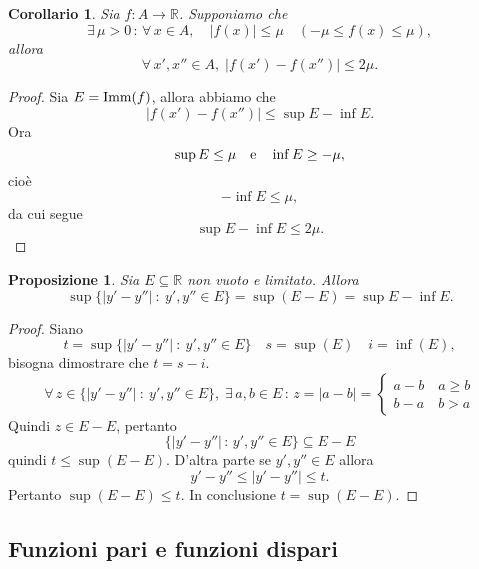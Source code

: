\documentclass{article}
\theoremstyle{plain}
\newtheorem{prop}[thm]{Proposizione}
\newtheorem{cor}{Corollario}
\theoremstyle{definition}
\theoremstyle{remark}
\begin{document}
\vspace{10pt}

\begin{bxthm}
\begin{cor}
    Sia $f:A\to\mathbb{R}$. Supponiamo che 
    \[\exists\,\mu>0\,:\,\forall\, x\in A,\quad |f(x)|\leq\mu\quad (-\mu\leq f(x)\leq \mu),\]
    allora \[\forall\, x',x''\in A,\; |f(x')-f(x'')|\leq 2\mu.\]
\end{cor}
\end{bxthm}
\begin{proof}
    Sia $E=\textup{Imm}(f)$, allora abbiamo che \[|f(x')-f(x'')|\leq\sup E-\inf E.\]
    Ora \[\sup E\leq\mu\quad\textup{e}\quad\inf E\geq -\mu,\] cioè \[-\inf E\leq \mu,\] da cui segue 
    \[\sup E-\inf E\leq 2\mu.\]
\end{proof}

\vspace{10pt}

\begin{bxthm}
\begin{prop}
    Sia $E\subseteq\mathbb{R}$ non vuoto e limitato.
    Allora \[\sup\{|y'-y''| \ : \ y',y''\in E\}=\sup(E-E)=\sup E-\inf E.\]
\end{prop}
\end{bxthm}
\begin{proof}
    Siano 
    \[t=\sup\{|y'-y''| \  : \ y',y''\in E\}\quad s=\sup(E)\quad i=\inf (E),\]
    bisogna dimostrare che $t=s-i$.
    \[\forall\,z\in\{|y'-y''| \  : \ y',y''\in E\},\;\exists\, a,b\in E \,  : \, z=|a-b|=\begin{cases}
        a-b\quad a\geq b\\
        b-a\quad b>a
    \end{cases}\]
    Quindi $z\in E-E$, pertanto
    \[\{|y'-y''|\,  : \, y',y''\in E\}\subseteq E-E\] quindi $t\leq\sup(E-E)$.
    D'altra parte se $y',y''\in E$ allora \[y'-y''\leq |y'-y''|\leq t.\]
    Pertanto $\sup(E-E)\leq t$.
    In conclusione $t=\sup(E-E)$.
\end{proof}

\vspace{10pt}

\subsection{Funzioni pari e funzioni dispari}

\vspace{10pt}
\end{document}
